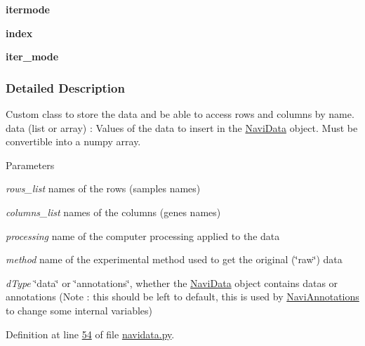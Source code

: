 \begin{DoxyCompactItemize}
\item 
\hypertarget{classnavicom_1_1navidata_1_1NaviData_a21c96bfd996af8dd4a12877aa54d4393}{
{\bfseries itermode}}
\label{classnavicom_1_1navidata_1_1NaviData_a21c96bfd996af8dd4a12877aa54d4393}

\item 
\hypertarget{classnavicom_1_1navidata_1_1NaviData_adb2e7ce6c9a691a186d91d4a8d49864a}{
{\bfseries index}}
\label{classnavicom_1_1navidata_1_1NaviData_adb2e7ce6c9a691a186d91d4a8d49864a}

\item 
\hypertarget{classnavicom_1_1navidata_1_1NaviData_ac21c979a9421ac607778d907380475fc}{
{\bfseries iter\_\-mode}}
\label{classnavicom_1_1navidata_1_1NaviData_ac21c979a9421ac607778d907380475fc}

\end{DoxyCompactItemize}


\subsubsection{Detailed Description}
Custom class to store the data and be able to access rows and columns by name. data (list or array) : Values of the data to insert in the \hyperlink{classnavicom_1_1navidata_1_1NaviData}{NaviData} object. Must be convertible into a numpy array. 
\begin{DoxyParams}{Parameters}
\item[{\em rows\_\-list}]names of the rows (samples names) \item[{\em columns\_\-list}]names of the columns (genes names) \item[{\em processing}]name of the computer processing applied to the data \item[{\em method}]name of the experimental method used to get the original (\char`\"{}raw\char`\"{}) data \item[{\em dType}]\char`\"{}data\char`\"{} or \char`\"{}annotations\char`\"{}, whether the \hyperlink{classnavicom_1_1navidata_1_1NaviData}{NaviData} object contains datas or annotations (Note : this should be left to default, this is used by \hyperlink{classnavicom_1_1navidata_1_1NaviAnnotations}{NaviAnnotations} to change some internal variables) \end{DoxyParams}


Definition at line \hyperlink{navidata_8py_source_l00054}{54} of file \hyperlink{navidata_8py_source}{navidata.py}.



